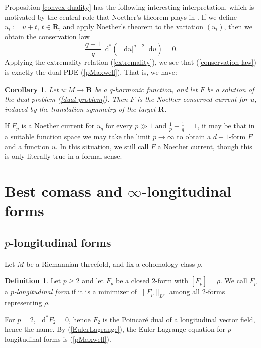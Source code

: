 \documentclass[reqno,11pt]{amsart}
\newcommand{\RR}{\mathbf{R}}
\newcommand*\dif{\mathop{}\!\mathrm{d}}
\newcommand{\dfn}[1]{\emph{#1}\index{#1}}
\newtheorem{corollary}[theorem]{Corollary}
\theoremstyle{definition}
\newtheorem{definition}[theorem]{Definition}
\numberwithin{equation}{section}
\begin{document}
Proposition \ref{convex duality} has the following interesting interpretation, which is motivated by the central role that Noether's theorem plays in \cite{daskalopoulos2022, daskalopoulos2023}.
If we define $u_t := u + t$, $t \in \RR$, and apply Noether's theorem \cite[\S8.6.2]{evans2010partial} to the variation $(u_t)$, then we obtain the conservation law 
\begin{equation}\label{conservation law}
	\frac{q - 1}{q} \dif^*(|\dif u|^{q - 2} \dif u) = 0.
\end{equation}
Applying the extremality relation (\ref{extremality}), we see that (\ref{conservation law}) is exactly the dual PDE (\ref{pMaxwell}).
That is, we have:

\begin{corollary}
Let $u: M \to \RR$ be a $q$-harmonic function, and let $F$ be a solution of the dual problem (\ref{dual problem}).
Then $F$ is the Noether conserved current for $u$, induced by the translation symmetry of the target $\RR$.
\end{corollary}

If $F_p$ is a Noether current for $u_q$ for every $p \gg 1$ and $\frac{1}{p} + \frac{1}{q} = 1$, it may be that in a suitable function space we may take the limit $p \to \infty$ to obtain a $d-1$-form $F$ and a function $u$.
In this situation, we still call $F$ a Noether current, though this is only literally true in a formal sense.


\section{Best comass and \texorpdfstring{$\infty$-longitudinal forms}{infinity-longitudinal forms}}
\subsection{\texorpdfstring{$p$-longitudinal forms}{p-longitudinal forms}}
Let $M$ be a Riemannian threefold, and fix a cohomology class $\rho$.

\begin{definition}
Let $p \geq 2$ and let $F_p$ be a closed $2$-form with $[F_p] = \rho$.
We call $F_p$ a \dfn{$p$-longitudinal form} if it is a minimizer of $\|F_p\|_{L^p}$ among all $2$-forms representing $\rho$.
\end{definition}

For $p = 2$, $\dif^* F_2 = 0$, hence $F_2$ is the Poincar\'e dual of a longitudinal vector field, hence the name.
By (\ref{EulerLagrange}), the Euler-Lagrange equation for $p$-longitudinal forms is (\ref{pMaxwell}).
\end{document}

